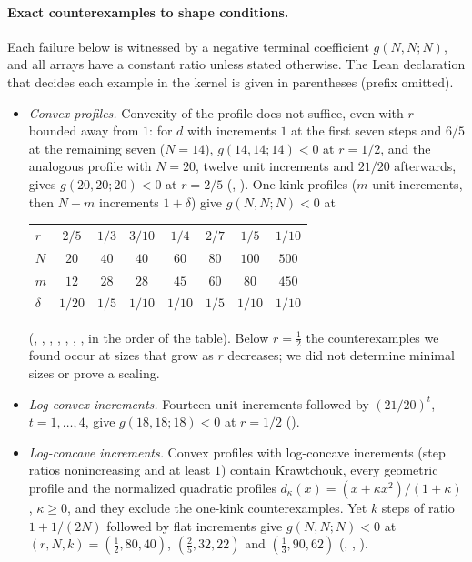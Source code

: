 \paragraph{Exact counterexamples to shape conditions.} Each failure below is witnessed by a negative terminal coefficient $g(N,N;N)$, and all arrays have a constant ratio unless stated otherwise. The Lean declaration that decides each example in the kernel is given in parentheses (prefix  omitted).
\begin{itemize}
\item \emph{Convex profiles.} Convexity of the profile does not suffice, even with $r$ bounded away from $1$: for $d$ with increments $1$ at the first seven steps and $6/5$ at the remaining seven ($N=14$), $g(14,14;14)<0$ at $r=1/2$, and the analogous profile with $N=20$, twelve unit increments and $21/20$ afterwards, gives $g(20,20;20)<0$ at $r=2/5$ (, ). One-kink profiles ($m$ unit increments, then $N-m$ increments $1+\delta$) give $g(N,N;N)<0$ at
\begin{center}
\begin{tabular}{@{}lccccccc@{}}
$r$&$2/5$&$1/3$&$3/10$&$1/4$&$2/7$&$1/5$&$1/10$\\
$N$&$20$&$40$&$40$&$60$&$80$&$100$&$500$\\
$m$&$12$&$28$&$28$&$45$&$60$&$80$&$450$\\
$\delta$&$1/20$&$1/5$&$1/10$&$1/10$&$1/5$&$1/10$&$1/10$
\end{tabular}
\end{center}
(, , , , , , , in the order of the table).
Below $r=\tfrac12$ the counterexamples we found occur at sizes that grow as $r$ decreases; we did not determine minimal sizes or prove a scaling.
\item \emph{Log-convex increments.} Fourteen unit increments followed by $(21/20)^t$, $t=1,\ldots,4$, give $g(18,18;18)<0$ at $r=1/2$ ().
\item \emph{Log-concave increments.} Convex profiles with log-concave increments (step ratios nonincreasing and at least $1$) contain Krawtchouk, every geometric profile and the normalized quadratic profiles $d_\kappa(x)=(x+\kappa x^2)/(1+\kappa)$, $\kappa\geq0$, and they exclude the one-kink counterexamples. Yet $k$ steps of ratio $1+1/(2N)$ followed by flat increments give $g(N,N;N)<0$ at $(r,N,k)=(\tfrac12,80,40)$, $(\tfrac25,32,22)$ and $(\tfrac13,90,62)$ (, , ).

\end{itemize}
